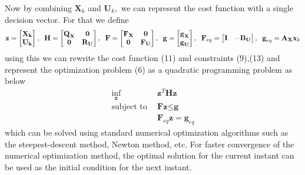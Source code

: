 \documentclass{article}
\begin{document}
Now by combining $\textbf{X}_{k}$ and $\textbf{U}_{k},$ we can represent the cost function with a single decision vector. For that we define 
\begin{equation}
\textbf{z} = \left[\begin{matrix}
\textbf{X}_{\textbf{k}}\\ \textbf{U}_{\textbf{k}}
\end{matrix}\right], \hspace{.2cm}\textbf{H}= \left[\begin{matrix}
\textbf{Q}_{\textbf{X}} & \textbf{0} \\\textbf{0} & \textbf{R}_{\textbf{U}}
\end{matrix}\right],
\hspace{.2cm}\textbf{F} = \left[\begin{matrix}
\textbf{F}_{\textbf{X}} &\textbf{0} \\\textbf{0} & \textbf{F}_{\textbf{U}}
\end{matrix}\right], \hspace{.2cm}\textbf{g} = \left[\begin{matrix}
\textbf{g}_{\textbf{X}} \\\textbf{g}_{\textbf{U}}
\end{matrix}\right],\hspace{.2cm}\textbf{F}_{eq} = \left[\begin{matrix}
\textbf{I}& -\textbf{B}_{\textbf{U}}
\end{matrix}\right]
, \hspace{.2cm}\textbf{g}_{eq} =\textbf{A}_{\textbf{X}}\textbf{x}_{k}
\end{equation}
using this we can rewrite the cost function (11) and constraints (9),(13) and represent the optimization problem (6) as a quadratic programming problem as below
\begin{equation}
\begin{aligned}
 \underset{\textbf{z}}{\text{inf}} ~&~     \textbf{z}^{T}\textbf{H}\textbf{z}\\ 
 \text{subject to}
~&~ \textbf{F}\textbf{z} \leq \textbf{g}\\
  ~&~ \textbf{F}_{eq}\textbf{z} = \textbf{g}_{eq}
     \end{aligned}
\end{equation}
which can be solved using standard numerical optimization algorithms such as the steepest-descent method, Newton method, etc.
For faster convergence of the numerical optimization method, the optimal solution for the current instant can be used as the initial condition for the next instant.
\end{document}
